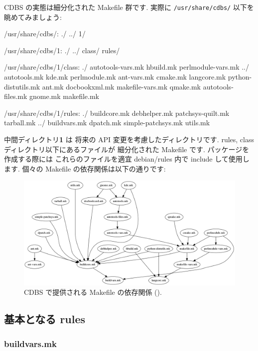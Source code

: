 \documentclass[mingoth,a4paper]{jsarticle}
\begin{document}
CDBS の実態は細分化された Makefile 群です.
実際に {\tt /usr/share/cdbs/} 以下を眺めてみましょう:
\begin{commandline}
/usr/share/cdbs/:
./  ../  1/

/usr/share/cdbs/1:
./  ../  class/  rules/

/usr/share/cdbs/1/class:
./                  autotools-vars.mk  hbuild.mk         perlmodule-vars.mk
../                 autotools.mk       kde.mk            perlmodule.mk
ant-vars.mk         cmake.mk           langcore.mk       python-distutils.mk
ant.mk              docbookxml.mk      makefile-vars.mk  qmake.mk
autotools-files.mk  gnome.mk           makefile.mk

/usr/share/cdbs/1/rules:
./   buildcore.mk  debhelper.mk  patchsys-quilt.mk   tarball.mk
../  buildvars.mk  dpatch.mk     simple-patchsys.mk  utils.mk
\end{commandline}
中間ディレクトリ{\bf 1} は
将来の API 変更を考慮したディレクトリです.
rules, class ディレクトリ以下にあるファイルが
細分化された Makefile です.
パッケージを作成する際には
これらのファイルを適宜 debian/rules 内で include して使用します.
個々の Makefile の依存関係は以下の通りです:
%
\begin{figure}[htbp!]
 \begin{center}
  \includegraphics[width=160mm]{image200810/cdbs-mk-depend.png}
 \end{center}
    \caption{%
    CDBS で提供される Makefile の依存関係
    (\cite{lenny CDBS doc}).
    }
    \label{fig:cdbs-mk-depend}
\end{figure}

\subsection{基本となる rules}
\label{section:rules}

\subsubsection{buildvars.mk}
\end{document}
